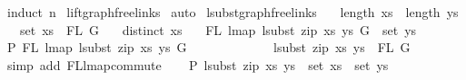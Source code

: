 \begin{isabellebody}
%
\isadelimproof
%
\endisadelimproof
%
\isatagproof
{}\isamarkupfalse%
\ {\isacharparenleft}{\kern0pt}induct\ n{\isacharparenright}{\kern0pt}\isanewline
{}\isamarkupfalse%
\ lift{\isacharunderscore}{\kern0pt}graph{\isacharunderscore}{\kern0pt}freelinks\isanewline
{}\isamarkupfalse%
\ auto%
\endisatagproof
{\isafoldproof}%
%
\isadelimproof
\isanewline
%
\endisadelimproof
\isanewline
{}\isamarkupfalse%
\ lsubst{\isacharunderscore}{\kern0pt}graph{\isacharunderscore}{\kern0pt}freelinks{\isacharcolon}{\kern0pt}\isanewline
\ \ \ {\isachardoublequoteopen}length\ xs\ {\isacharequal}{\kern0pt}\ length\ ys{\isachardoublequoteclose}\isanewline
\ \ \ {\isachardoublequoteopen}set\ xs\ {\isacharequal}{\kern0pt}\ FL\ G{\isachardoublequoteclose}\isanewline
\ \ \ {\isachardoublequoteopen}distinct\ xs{\isachardoublequoteclose}\isanewline
\ \ \ {\isachardoublequoteopen}FL\ {\isacharparenleft}{\kern0pt}lmap\ {\isacharparenleft}{\kern0pt}lsubst\ {\isacharparenleft}{\kern0pt}zip\ xs\ ys{\isacharparenright}{\kern0pt}{\isacharparenright}{\kern0pt}\ G{\isacharparenright}{\kern0pt}\ {\isacharequal}{\kern0pt}\ set\ ys{\isachardoublequoteclose}\isanewline
%
\isadelimproof
%
\endisadelimproof
%
\isatagproof
{}\isamarkupfalse%
\ {\isacharminus}{\kern0pt}\isanewline
\ \ \isamarkupfalse%
\ P{}{\isacharcolon}{\kern0pt}\ {\isachardoublequoteopen}FL\ {\isacharparenleft}{\kern0pt}lmap\ {\isacharparenleft}{\kern0pt}lsubst\ {\isacharparenleft}{\kern0pt}zip\ xs\ ys{\isacharparenright}{\kern0pt}{\isacharparenright}{\kern0pt}\ G{\isacharparenright}{\kern0pt}\ {\isacharequal}{\kern0pt}\isanewline
\ \ \ \ \ \ \ \ \ \ \ \ {\isacharparenleft}{\kern0pt}lsubst\ {\isacharparenleft}{\kern0pt}zip\ xs\ ys{\isacharparenright}{\kern0pt}{\isacharparenright}{\kern0pt}\ {\isacharbackquote}{\kern0pt}\ FL\ G{\isachardoublequoteclose}\isanewline
\ \ \ \ \isamarkupfalse%
\ {\isacharparenleft}{\kern0pt}simp\ add{\isacharcolon}{\kern0pt}\ FL{\isacharunderscore}{\kern0pt}lmap{\isacharunderscore}{\kern0pt}commute{\isacharparenright}{\kern0pt}\isanewline
\ \ \isamarkupfalse%
\ P{}{\isacharcolon}{\kern0pt}\ {\isachardoublequoteopen}lsubst\ {\isacharparenleft}{\kern0pt}zip\ xs\ ys{\isacharparenright}{\kern0pt}\ {\isacharbackquote}{\kern0pt}\ set\ xs\ {\isacharequal}{\kern0pt}\ set\ ys{\isachardoublequoteclose}\isanewline
\ \ \ \ \isamarkupfalse%

\end{isabellebody}
